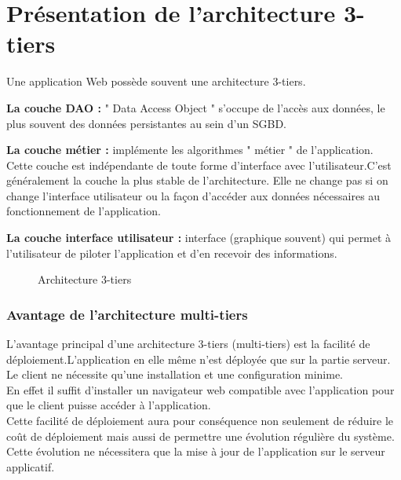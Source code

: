 \documentclass{report}
\begin{document}
\section{Présentation de l’architecture 3-tiers}
Une application Web possède souvent une architecture 3-tiers.\\
\begin{description}
    \item{\textbf{La couche DAO :}} " Data Access Object " s'occupe de l'accès aux données, le plus souvent des données persistantes au sein d'un SGBD.\\
    \item{\textbf{La couche métier :}} implémente les algorithmes " métier " de l'application. Cette couche est indépendante de toute forme d'interface avec l'utilisateur.C'est généralement la couche la plus stable de l'architecture. Elle ne change pas si on change l'interface utilisateur ou la façon d'accéder aux données nécessaires au fonctionnement de l'application.\\
    \item{\textbf{La couche interface utilisateur :}} interface (graphique souvent) qui permet à l'utilisateur de piloter l'application et d'en recevoir des informations.\\
\end{description}

\begin{figure}[h]
        \centering
        \caption{Architecture 3-tiers}
    \end{figure}

\subsubsection*{Avantage de l'architecture multi-tiers }
L'avantage principal d'une architecture 3-tiers (multi-tiers) est la facilité de déploiement.L'application en elle même n'est déployée que sur la partie serveur.\\Le client ne nécessite qu'une installation et une configuration minime.\\En effet il suffit d'installer un navigateur web compatible avec l'application pour que le client puisse accéder à l'application.\\Cette facilité de déploiement aura pour conséquence non seulement de réduire le coût de déploiement mais aussi de permettre une évolution régulière du système. Cette évolution ne nécessitera que la mise à jour de l'application sur le serveur applicatif.\cite{tier}
\end{document}
